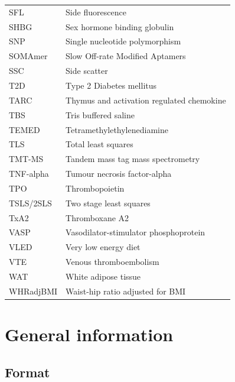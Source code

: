 \documentclass[11pt,twoside]{bristolthesis}
\newcommand\blankpage{%
    \null
    \thispagestyle{empty}%
    \addtocounter{page}{-1}%
    \newpage}
\begin{document}
\begin{abbreviations}
\begin{longtable}[t]{ll}
    SFL & Side fluorescence\\
    SHBG & Sex hormone binding globulin\\
    \addlinespace
    SNP & Single nucleotide polymorphism\\
    SOMAmer & Slow Off-rate Modified Aptamers\\
    SSC & Side scatter\\
    T2D & Type 2 Diabetes mellitus\\
    TARC & Thymus and activation regulated chemokine\\
    \addlinespace
    TBS & Tris buffered saline\\
    TEMED & Tetramethylethylenediamine\\
    TLS & Total least squares\\
    TMT-MS & Tandem mass tag mass spectrometry\\
    TNF-alpha & Tumour necrosis factor-alpha\\
    \addlinespace
    TPO & Thrombopoietin\\
    TSLS/2SLS & Two stage least squares\\
    TxA2 & Thromboxane A2\\
    VASP & Vasodilator-stimulator phosphoprotein\\
    VLED & Very low energy diet\\
    \addlinespace
    VTE & Venous thromboembolism\\
    WAT & White adipose tissue\\
    WHRadjBMI & Waist-hip ratio adjusted for BMI\\
    \bottomrule
    \end{longtable}
    \afterpage{\blankpage}
  \end{abbreviations}
\endgroup


\mainmatter %
\pagestyle{plain}

\hypertarget{general-information}{%
\chapter{General information}\label{general-information}}

\hypertarget{format}{%
\section{Format}\label{format}}
\end{document}
